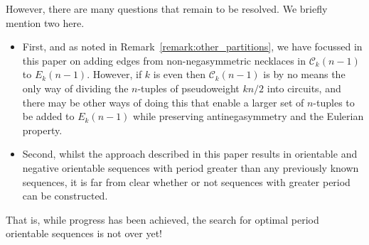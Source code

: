 \documentclass[a4paper,11pt]{article}
\theoremstyle{plain}
\theoremstyle{definition}
\theoremstyle{remark}
\begin{document}
However, there are many questions that remain to be resolved.  We briefly mention two here.
\begin{itemize}
\item First, and as noted in Remark~\ref{remark:other_partitions}, we have focussed in this
    paper on adding edges from non-negasymmetric necklaces in $\mathcal{C}_k(n-1)$ to
    $E_k(n-1)$. However, if $k$ is even then $\mathcal{C}_k(n-1)$ is by no means the only way
    of dividing the $n$-tuples of pseudoweight $kn/2$ into circuits, and there may be other
    ways of doing this that enable a larger set of $n$-tuples to be added to $E_k(n-1)$ while
    preserving antinegasymmetry and the Eulerian property.
\item Second, whilst the approach described in this paper results in orientable and negative
    orientable sequences with period greater than any previously known sequences, it is far
    from clear whether or not sequences with greater period can be constructed.
\end{itemize}
That is, while progress has been achieved, the search for optimal period orientable sequences is
not over yet!

%
%
%
%
\end{document}
